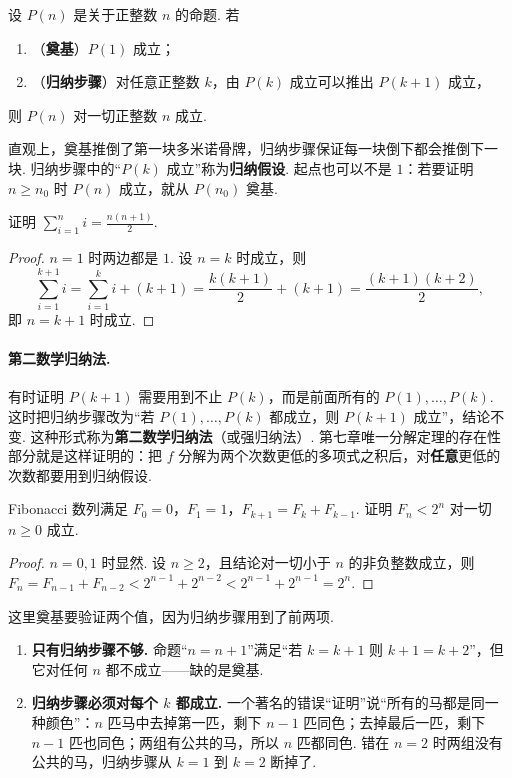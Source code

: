 \begin{theorem}[数学归纳法]
	设 $P(n)$ 是关于正整数 $n$ 的命题. 若
	\begin{enumerate}
		\item （\textbf{奠基}）$P(1)$ 成立；
		\item （\textbf{归纳步骤}）对任意正整数 $k$，由 $P(k)$ 成立可以推出 $P(k+1)$ 成立，
	\end{enumerate}
	则 $P(n)$ 对一切正整数 $n$ 成立.
\end{theorem}

直观上，奠基推倒了第一块多米诺骨牌，归纳步骤保证每一块倒下都会推倒下一块. 归纳步骤中的“$P(k)$ 成立”称为\textbf{归纳假设}. 起点也可以不是 $1$：若要证明 $n\ge n_0$ 时 $P(n)$ 成立，就从 $P(n_0)$ 奠基.

\begin{example}
	证明 $\displaystyle\sum_{i=1}^n i=\frac{n(n+1)}2$.
\end{example}
\begin{proof}
	$n=1$ 时两边都是 $1$. 设 $n=k$ 时成立，则
	\[\sum_{i=1}^{k+1}i=\sum_{i=1}^ki+(k+1)=\frac{k(k+1)}2+(k+1)=\frac{(k+1)(k+2)}2,\]
	即 $n=k+1$ 时成立.
\end{proof}

\paragraph*{第二数学归纳法.} 有时证明 $P(k+1)$ 需要用到不止 $P(k)$，而是前面所有的 $P(1),\ldots,P(k)$. 这时把归纳步骤改为“若 $P(1),\ldots,P(k)$ 都成立，则 $P(k+1)$ 成立”，结论不变. 这种形式称为\textbf{第二数学归纳法}（或强归纳法）. 第七章唯一分解定理的存在性部分就是这样证明的：把 $f$ 分解为两个次数更低的多项式之积后，对\textbf{任意}更低的次数都要用到归纳假设.

\begin{example}
	Fibonacci 数列满足 $F_0=0$，$F_1=1$，$F_{k+1}=F_k+F_{k-1}$. 证明 $F_n<2^n$ 对一切 $n\ge0$ 成立.
\end{example}
\begin{proof}
	$n=0,1$ 时显然. 设 $n\ge2$，且结论对一切小于 $n$ 的非负整数成立，则 $F_n=F_{n-1}+F_{n-2}<2^{n-1}+2^{n-2}<2^{n-1}+2^{n-1}=2^n$.
\end{proof}
这里奠基要验证两个值，因为归纳步骤用到了前两项.

\begin{pitfallbox}
	\begin{enumerate}
		\item \textbf{只有归纳步骤不够.} 命题“$n=n+1$”满足“若 $k=k+1$ 则 $k+1=k+2$”，但它对任何 $n$ 都不成立——缺的是奠基.
		\item \textbf{归纳步骤必须对每个 $k$ 都成立.} 一个著名的错误“证明”说“所有的马都是同一种颜色”：$n$ 匹马中去掉第一匹，剩下 $n-1$ 匹同色；去掉最后一匹，剩下 $n-1$ 匹也同色；两组有公共的马，所以 $n$ 匹都同色. 错在 $n=2$ 时两组没有公共的马，归纳步骤从 $k=1$ 到 $k=2$ 断掉了.
	\end{enumerate}
\end{pitfallbox}

